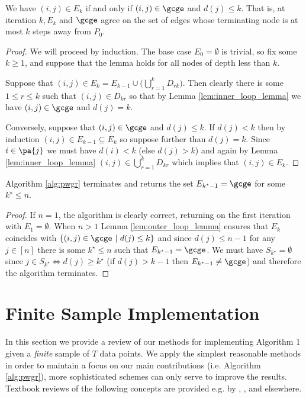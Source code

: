 \begin{lemma}
  \label{lem:outer_loop_lemma}
  We have $(i, j) \in E_k$ if and only if $(i, j) \in \gcge$ and
  $d(j) \le k$.  That is, at iteration $k, E_k$ and $\gcge$ agree on
  the set of edges whose terminating node is at most $k$ steps away
  from $P_0$.
\end{lemma}
\begin{proof}
  We will proceed by induction.  The base case $E_0 = \emptyset$ is
  trivial, so fix some $k \ge 1$, and suppose that the lemma holds for
  all nodes of depth less than $k$.

  Suppose that
  $(i, j) \in E_k = E_{k - 1}\cup \big(\bigcup_{r = 1}^k D_{rk}
  \big)$.  Then clearly there is some $1 \le r \le k$ such that
  $(i, j) \in D_{kr}$ so that by Lemma \ref{lem:inner_loop_lemma} we
  have $(i, j) \in \gcge$ and $d(j) = k$.

  Conversely, suppose that $(i, j) \in \gcge$ and $d(j) \le k$.  If
  $d(j) < k$ then by induction $(i, j) \in E_{k - 1} \subseteq E_k$ so
  suppose further than $d(j) = k$.  Since $i \in \pa{j}$ we must have
  $d(i) < k$ (else $d(j) > k$) and again by Lemma
  \ref{lem:inner_loop_lemma} $(i, j) \in \bigcup_{r = 1}^k D_{kr}$
  which implies that $(i, j) \in E_k$.
\end{proof}

\begin{lemma}
  Algorithm \ref{alg:pwgr} terminates and returns the set
  $E_{k^\star - 1} = \gcge$ for some $k^\star \le n$.
\end{lemma}
\begin{proof}
  If $n = 1$, the algorithm is clearly correct, returning on the first
  iteration with $E_1 = \emptyset$.  When $n > 1$ Lemma
  \ref{lem:outer_loop_lemma} ensures that $E_k$ coincides with
  $\{(i, j) \in \gcge\ |\ d(j) \le k\}$ and since $d(j) \le n - 1$ for
  any $j \in [n]$ there is some $k^\star \le n$ such that
  $E_{k^\star - 1} = \gcge$.  We must have $S_{k^\star} = \emptyset$
  since $j \in S_{k^\star} \iff d(j) \ge k^\star$ (if $d(j) > k - 1$ then
  $E_{k^\star - 1} \ne \gcge$) and therefore the algorithm terminates.
\end{proof}

\section{Finite Sample Implementation}
\label{sec:structure_learning}
In this section we provide a review of our methods for implementing
Algorithm 1 given a \textit{finite} sample of $T$ data points.  We
apply the simplest reasonable methods in order to maintain a focus on
our main contributions (i.e. Algorithm \ref{alg:pwgr}), more
sophisticated schemes can only serve to improve the results.  Textbook
reviews of the following concepts are provided e.g. by
\cite{all_of_statistics}, \cite{murphy_mlp}, and elsewhere.

